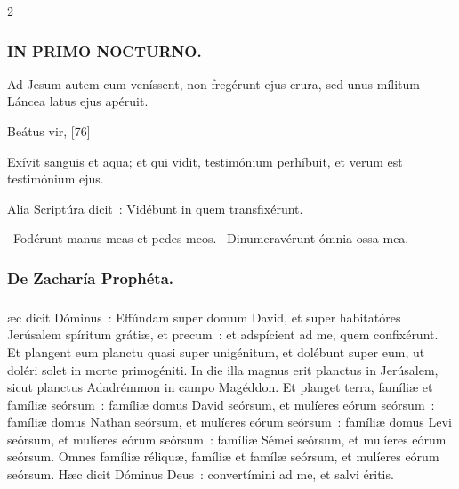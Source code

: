 \documentclass[9pt,twoside]{extarticle}
\begin{document}
\begin{multicols}{2}
\begin{tightlist}{}
\item {}
\end{tightlist}

\subsubsection*{\center  \textsc{IN PRIMO NOCTURNO.}}
\begin{tightlist}{}
\item {} Ad Jesum autem cum veníssent, non fregérunt ejus crura, sed unus mílitum Láncea latus ejus apéruit.
\item {} Beátus vir, [76] 
\item {} Exívit sanguis et aqua; et qui vidit, testimónium perhíbuit, et verum est testimónium ejus.
\item {} Alia Scriptúra dicit~: Vidébunt in quem transfixérunt.
\item {}~Fodérunt manus meas et pedes meos. ~Dinumeravérunt ómnia ossa mea.
\end{tightlist}

\subsubsection*{\center De Zacharía Prophéta.}
\subsubsection*{\center {}}
æc dicit Dóminus~: Effúndam super domum David, et super habitatóres Jerúsalem spíritum grátiæ, et precum~: et adspícient ad me, quem confixérunt. Et plangent eum planctu quasi super unigénitum, et dolébunt super eum, ut doléri solet in morte primogéniti. In die illa magnus erit planctus in Jerúsalem, sicut planctus Adadrémmon in campo Magéddon. Et planget terra, famíliæ et famíliæ seórsum~: famíliæ domus David seórsum, et mulíeres eórum seórsum~: famíliæ domus Nathan seórsum, et mulíeres eórum seórsum~: famíliæ domus Levi seórsum, et mulíeres eórum seórsum~: famíliæ Sémei seórsum, et mulíeres eórum seórsum. Omnes famíliæ réliquæ, famíliæ et famílæ seórsum, et mulíeres eórum seórsum. Hæc dicit Dóminus Deus~: convertímini ad me, et salvi éritis.


\end{multicols}
\end{document}
